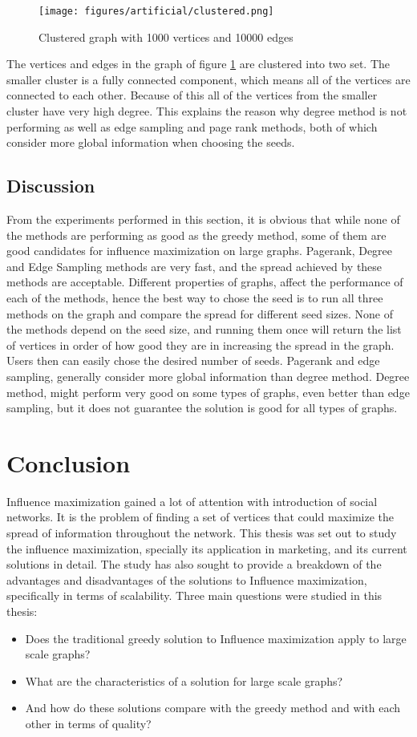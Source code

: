 \documentclass[english]{tktltiki}
\begin{document}
\begin{figure}[ht!]
\centering
\texttt{[image: figures/artificial/clustered.png]}
\caption{Clustered graph with 1000 vertices and 10000 edges}
\label{art:clustered}
\end{figure}

The vertices and edges in the graph of figure \ref{art:clustered} are clustered into two set. 
The smaller cluster is a fully connected component, which means all of the vertices are connected to each other. 
Because of this all of the vertices from the smaller cluster have very high degree. 
This explains the reason why degree method is not performing as well as edge sampling and page rank methods, both of which consider more global information when choosing the seeds.
\subsection{Discussion}
From the experiments performed in this section, it is obvious that while none of the methods are performing as good as the greedy method, some of them are good candidates for influence maximization on large graphs. 
Pagerank, Degree and Edge Sampling methods are very fast, and the spread achieved by these methods are acceptable. 
Different properties of graphs, affect the performance of each of the methods, hence the best way to chose the seed is to run all three methods on the graph and compare the spread for different seed sizes. 
None of the methods depend on the seed size, and running them once will return the list of vertices in order of how good they are in increasing the spread in the graph. 
Users then can easily chose the desired number of seeds. 
Pagerank and edge sampling, generally consider more global information than degree method. 
Degree method, might perform very good on some types of graphs, even better than edge sampling, but it does not guarantee the solution is good for all types of graphs. 

\newpage
\section{Conclusion}
\label{sec:conclusion}
Influence maximization gained a lot of attention with introduction of social networks. 
It is the problem of finding a set of vertices that could maximize the spread of information throughout the network.
This thesis was set out to study the influence maximization, specially its application in marketing, and its current solutions in detail.
The study has also sought to provide a breakdown of the advantages and disadvantages of the solutions to Influence maximization, specifically in terms of scalability. 
Three main questions were studied in this thesis: 
\begin{itemize}
\item Does the traditional greedy solution to Influence maximization apply to large scale graphs?
\item What are the characteristics of a solution for large scale graphs?
\item And how do these solutions compare with the greedy method and with each other in terms of quality?
\end{itemize}
\end{document}
